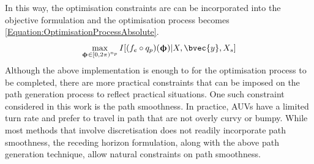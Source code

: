 			In this way, the optimisation constraints are can be incorporated into the objective formulation and the optimisation process becomes \eqref{Equation:OptimisationProcessAbsolute}. \begin{equation}
				\max_{\vec{\upphi} \in [0, 2 \pi)^{n_{p}}} I[(f_{e} \circ q_{p})(\vec{\upphi}) | X, \bvec{y}, X_{s}]				
			\label{Equation:OptimisationProcessAbsolute}
			\end{equation} Although the above implementation is enough to for the optimisation process to be completed, there are more practical constraints that can be imposed on the path generation process to reflect practical situations. One such constraint considered in this work is the path smoothness. In practice, AUVs have a limited turn rate and prefer to travel in path that are not overly curvy or bumpy. While most methods that involve discretisation does not readily incorporate path smoothness, the receding horizon formulation, along with the above path generation technique, allow natural constraints on path smoothness.
			
